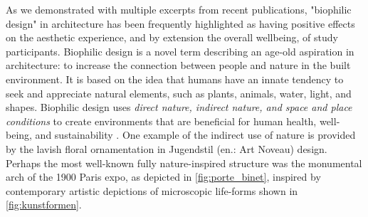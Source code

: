 \documentclass{article}
\begin{document}
\begin{multicols}{2}

As we demonstrated with multiple excerpts from recent publications, "biophilic design" in architecture has been frequently highlighted as having positive effects on the aesthetic experience, and by extension the overall wellbeing, of study participants. Biophilic design is a novel term describing an age-old aspiration in architecture: to increase the connection between people and nature in the built environment. It is based on the idea that humans have an innate tendency to seek and appreciate natural elements, such as plants, animals, water, light, and shapes. Biophilic design uses \textit{direct nature, indirect nature, and space and place conditions} to create environments that are beneficial for human health, well-being, and sustainability \cite{kellert_practice_2015}. One example of the indirect use of nature is provided by the lavish floral ornamentation in Jugendstil (en.: Art Noveau) design. Perhaps the most well-known fully nature-inspired structure was the monumental arch of the 1900 Paris expo, as depicted in \cref{fig:porte_binet}, inspired by contemporary artistic depictions of microscopic life-forms shown in \cref{fig:kunstformen}.
    
\end{multicols}
\vspace{-5mm}
\end{document}
